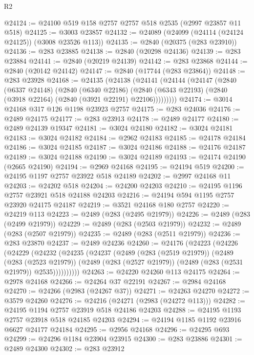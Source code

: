 \begin{lexlean}{R2}
\begin{coremodule}
@24124 := @24100 @519 @158 @2757 @2757 @518 @2535 (@2997 @23857 @11 @518)
@24125 := @3003 @23857
@24132 := @24089 (@24099 (@24114 (@24124 @24125)) (@3008 @23526 @113))
@24135 := @2840 (@20375 (@283 @23910))
@24136 := @283 @23885
@24138 := @2840 (@20298 @24136)
@24139 := @283 @23884
@24141 := @2840 (@20219 @24139)
@24142 := @283 @23868
@24144 := @2840 (@20142 @24142)
@24147 := @2840 (@17744 (@283 @23864))
@24148 := @283 @23928
@24168 := @24135
    (@24138
      (@24141
        (@24144
          (@24147
            (@2840
              (@6337 @24148)
              (@2840
                (@6340 @22186)
                (@2840 (@6343 @22193) (@2840 (@3918 @22164) (@2840 (@3921 @22191) @22106)))))))))
@24174 := @3014 @24168 @317 @126 @1198 @23923 @2757
@24175 := @283 @24036
@24176 := @2489 @24175
@24177 := @283 @23913
@24178 := @2489 @24177
@24180 := @2489 @24139 @19347
@24181 := @3024 @24180
@24182 := @3024 @24181
@24183 := @3024 @24182
@24184 := @2962 @24183
@24185 := @24178 @24184
@24186 := @3024 @24185
@24187 := @3024 @24186
@24188 := @24176 @24187
@24189 := @3024 @24188
@24190 := @3024 @24189
@24193 := @24174 @24190 (@2665 @24190)
@24194 := @2969 @24168
@24195 := @24194 @519
@24200 := @24195 @1197 @2757 @23922 @518 @24189
@24202 := @2997 @24168 @11
@24203 := @24202 @518
@24204 := @24200 @24203
@24210 := @24195 @1196 @2757 @23921 @518 @24188 @24203
@24216 := @24194 @594 @1195 @2757 @23920 @24175 @24187
@24219 := @3521 @24168 @180 @2757
@24220 := @24219 @113
@24223 := @2489 (@283 (@2495 @21979))
@24226 := @2489 (@283 (@2499 @21979))
@24229 := @2489 (@283 (@2503 @21979))
@24232 := @2489 (@283 (@2507 @21979))
@24235 := @2489 (@283 (@2511 @21979))
@24236 := @283 @23870
@24237 := @2489 @24236
@24260 := @24176
    (@24223
      (@24226
        (@24229
          (@24232
            (@24235
              (@24237
                (@2489
                  (@283 (@2519 @21979))
                  (@2489
                    (@283 (@2523 @21979))
                    (@2489 (@283 (@2527 @21979)) (@2489 (@283 (@2531 @21979)) @2535))))))))))
@24263 := @24220 @24260 @113 @24175
@24264 := @2978 @24168
@24266 := @24264 @37 @22191
@24267 := @2984 @24168
@24270 := @24266 (@2983 (@24267 @37))
@24271 := @24263 @24270
@24272 := @3579 @24260
@24276 := @24216 (@24271 (@2983 (@24272 @113)))
@24282 := @24195 @1194 @2757 @23919 @518 @24186 @24203
@24288 := @24195 @1193 @2757 @23918 @518 @24185 @24203
@24294 := @24194 @1185 @1192 @23916 @6627 @24177 @24184
@24295 := @2956 @24168
@24296 := @24295 @693
@24299 := @24296 @1184 @23904 @23915
@24300 := @283 @23886
@24301 := @2489 @24300
@24302 := @283 @23912

\end{coremodule}
\end{lexlean}
